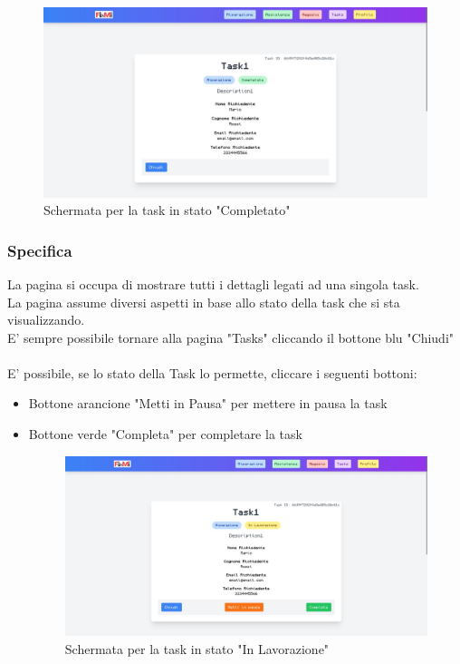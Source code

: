 \documentclass{report}
\begin{document}
\begin{figure}[H]
	\centering\includegraphics[width=1\textwidth]{images/microservizio-task/frontend/Completata.jpg}
	\caption{Schermata per la task in stato "Completato"}
\end{figure}
\subsubsection*{Specifica}
La pagina si occupa di mostrare tutti i dettagli legati ad una singola task.\\ La pagina assume diversi aspetti in base allo stato della task che si sta visualizzando.\\E' sempre possibile tornare alla pagina "Tasks" cliccando il bottone blu "Chiudi"\\\\
E' possibile, se lo stato della Task lo permette, cliccare i seguenti bottoni:

\begin{itemize}
	\item Bottone arancione "Metti in Pausa" per mettere in pausa la task 
	\item Bottone verde "Completa" per completare la task 
	\begin{figure}[H]
		\centering\includegraphics[width=1\textwidth]{images/microservizio-task/frontend/InLavorazione.jpg}
		\caption{Schermata per la task in stato "In Lavorazione"}
	\end{figure}
\end{itemize}
\end{document}
